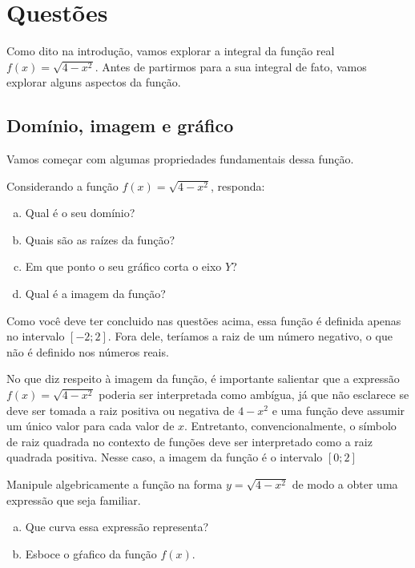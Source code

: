 \documentclass[main_estudante.tex]{subfiles}
\begin{document}
\section{Questões}

Como dito na introdução, vamos explorar a integral da função real $f(x)=\sqrt{4-x^2}$. Antes de partirmos para a sua integral de fato, vamos explorar alguns aspectos da função.

\subsection*{Domínio, imagem e gráfico}

Vamos começar com algumas propriedades fundamentais dessa função.

\begin{questao}
Considerando a função $f(x)=\sqrt{4-x^2}$, responda:
\begin{enumerate}[a)]
\item Qual é o seu domínio?
\item Quais são as raízes da função?
\item Em que ponto o seu gráfico corta o eixo $Y$?
\item Qual é a imagem da função?
\end{enumerate}
\end{questao}

Como você deve ter concluido nas questões acima, essa função é definida apenas no intervalo $[-2;2]$. Fora dele, teríamos a raiz de um número negativo, o que não é definido nos números reais.

No que diz respeito à imagem da função, é importante salientar que a expressão $f(x)=\sqrt{4-x^2}$ poderia ser interpretada como ambígua, já que não esclarece se deve ser tomada a raiz positiva ou negativa de $4-x^2$ e uma função deve assumir um único valor para cada valor de $x$. Entretanto, convencionalmente, o símbolo de raiz quadrada no contexto de funções deve ser interpretado como a raiz quadrada positiva. Nesse caso, a imagem da função é o intervalo $[0;2]$

\begin{questao}
Manipule algebricamente a função na forma $y=\sqrt{4-x^2}$ de modo a obter uma expressão que seja familiar. 
\begin{enumerate}[a)]
\item Que curva essa expressão representa?
\item Esboce o gŕafico da função $f(x)$.
\end{enumerate}
\end{questao}
\end{document}
